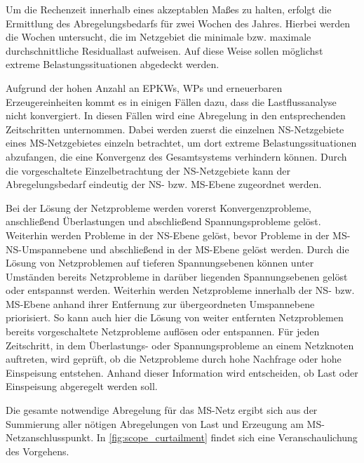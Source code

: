Um die Rechenzeit innerhalb eines akzeptablen Maßes zu halten, erfolgt die Ermittlung des Abregelungsbedarfs für zwei Wochen des Jahres.
Hierbei werden die Wochen untersucht, die im Netzgebiet die minimale bzw. maximale durchschnittliche Residuallast aufweisen.
Auf diese Weise sollen möglichst extreme Belastungssituationen abgedeckt werden.\medskip

Aufgrund der hohen Anzahl an \glspl{EPKW}, \glspl{WP} und erneuerbaren Erzeugereinheiten kommt es in einigen Fällen dazu, dass die Lastflussanalyse nicht konvergiert.
In diesen Fällen wird eine Abregelung in den entsprechenden Zeitschritten unternommen.
Dabei werden zuerst die einzelnen \gls{NS}-Netzgebiete eines \gls{MS}-Netzgebietes einzeln betrachtet, um dort extreme Belastungssituationen abzufangen, die eine Konvergenz des Gesamtsystems verhindern können.
Durch die vorgeschaltete Einzelbetrachtung der \gls{NS}-Netzgebiete kann der Abregelungsbedarf eindeutig der \gls{NS}- bzw. \gls{MS}-Ebene zugeordnet werden.\medskip

Bei der Lösung der Netzprobleme werden vorerst Konvergenzprobleme, anschließend Überlastungen und abschließend Spannungsprobleme gelöst.
Weiterhin werden Probleme in der \gls{NS}-Ebene gelöst, bevor Probleme in der \gls{MS}-\gls{NS}-Umspannebene und abschließend in der \gls{MS}-Ebene gelöst werden.
Durch die Lösung von Netzproblemen auf tieferen Spannungsebenen können unter Umständen bereits Netzprobleme in darüber liegenden Spannungsebenen gelöst oder entspannst werden.
Weiterhin werden Netzprobleme innerhalb der \gls{NS}- bzw. \gls{MS}-Ebene anhand ihrer Entfernung zur übergeordneten Umspannebene priorisiert.
So kann auch hier die Lösung von weiter entfernten Netzproblemen bereits vorgeschaltete Netzprobleme auflösen oder entspannen.
Für jeden Zeitschritt, in dem Überlastungs- oder Spannungsprobleme an einem Netzknoten auftreten, wird geprüft, ob die Netzprobleme durch hohe Nachfrage oder hohe Einspeisung entstehen.
Anhand dieser Information wird entscheiden, ob Last oder Einspeisung abgeregelt werden soll.\medskip

Die gesamte notwendige Abregelung für das \gls{MS}-Netz ergibt sich aus der Summierung aller nötigen Abregelungen von Last und Erzeugung am \gls{MS}-Netzanschlusspunkt.
In \autoref{fig:scope_curtailment} findet sich eine Veranschaulichung des Vorgehens.



